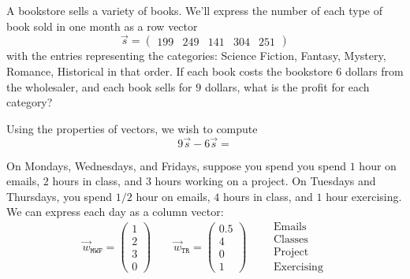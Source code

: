 \documentclass{ximera}
\begin{document}
\begin{example}
  A bookstore sells a variety of books. We'll express the number of
  each type of book sold in one month as a row vector
  \[
  \vec{s} = \begin{pmatrix}199 & 249 & 141 & 304 & 251 \end{pmatrix} 
  \]
  with the entries representing the categories: Science Fiction,
  Fantasy, Mystery, Romance, Historical in that order.  If each book
  costs the bookstore $6$ dollars from the wholesaler, and each book sells
  for $9$ dollars, what is the profit for each category?
  \begin{solution}
    Using the properties of vectors, we wish to compute
    \[
    9\vec{s}-6\vec{s} = 
    \]
  \end{solution}
  
\end{example}



\begin{example}
  On Mondays, Wednesdays, and Fridays, suppose you spend you spend $1$
  hour on emails, $2$ hours in class, and $3$ hours working on a
  project. On Tuesdays and Thursdays, you spend $1/2$ hour on emails,
  $4$ hours in class, and $1$ hour exercising. We can express each day
  as a column vector:
  \[
  \vec{w}_{\texttt{MWF}} =
  \begin{pmatrix}
    1 \\
    2 \\
    3 \\
    0
  \end{pmatrix}
  \qquad
  \vec{w}_{\texttt{TR}} =
  \begin{pmatrix}
    0.5\\
    4\\
    0\\
    1
  \end{pmatrix} \qquad
  \begin{array}{l}
    \text{Emails}\\
    \text{Classes}\\
    \text{Project}\\
    \text{Exercising}
  \end{array}
  \]
\end{example}
\end{document}
